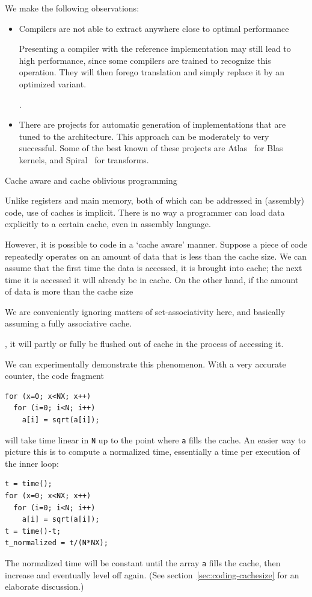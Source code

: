 We make the following observations:
\begin{itemize}
\item Compilers are not able to extract anywhere close
  to optimal performance
  \begin{footnoteenv}
    {Presenting a compiler with the
    reference implementation may still lead to high performance, since
    some compilers are trained to recognize this operation. They will
    then forego translation and simply replace it by an optimized
    variant.}
  \end{footnoteenv}
  .
\item There are  projects for automatic
  generation of implementations that are tuned to the
  architecture. This approach can be moderately to very
  successful. Some of the best known of these projects are
  Atlas~\cite{atlas-parcomp} for Blas kernels, and
  Spiral~\cite{spiral} for transforms.
\end{itemize}

 {Cache aware and cache oblivious programming}

Unlike registers and main memory, both of
which can be addressed in (assembly) code, use of caches is
implicit. There is no way a programmer can load data explicitly to a
certain cache, even in assembly language. 

However, it is possible to code in a `cache aware' manner. Suppose a
piece of code repeatedly operates on an amount of data that is less
than the cache size. We can assume that the first time the data is
accessed, it is brought into cache; the next time it is accessed it
will already be in cache. On the other hand, if the amount of data is
more than the cache size
\begin{footnoteenv}
  {We are conveniently ignoring matters
  of set-associativity here, and basically assuming a fully
  associative cache.}
\end{footnoteenv}
, it will partly or fully be flushed out of cache
in the process of accessing it.

We can experimentally demonstrate this phenomenon. With a very
accurate counter, the code fragment
\begin{verbatim}
for (x=0; x<NX; x++)
  for (i=0; i<N; i++)
    a[i] = sqrt(a[i]);
\end{verbatim}
will take time linear in \texttt{N} up to the point where \texttt{a}
fills the cache. An easier way to picture this is to compute a
normalized time, essentially a time per execution of the inner loop:
\begin{verbatim}
t = time();
for (x=0; x<NX; x++)
  for (i=0; i<N; i++)
    a[i] = sqrt(a[i]);
t = time()-t;
t_normalized = t/(N*NX);
\end{verbatim}
The normalized time will be constant until the array \texttt{a} fills
the cache, then increase and eventually level off again. (See
section~\ref{sec:coding-cachesize} for an elaborate discussion.)

